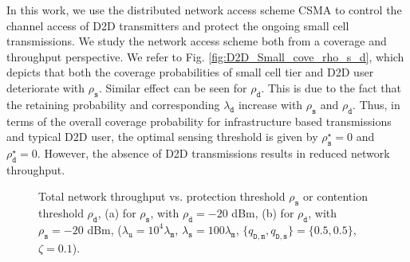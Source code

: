 \documentclass[twocolumn,english]{IEEEtran}
\theoremstyle{plain}
\theoremstyle{definition}
\begin{document}
In this work, we use the distributed network access scheme CSMA to
control the channel access of D2D transmitters and protect the ongoing
small cell transmissions. We study the network access scheme both
from a coverage and throughput perspective. We refer to Fig. \ref{fig:D2D_Small_cove_rho_s_d},
which depicts that both the coverage probabilities of small cell tier
and D2D user deteriorate with $\rho_{\mathtt{s}}$. Similar effect
can be seen for $\rho_{\mathtt{d}}$. This is due to the fact that
the retaining probability and corresponding $\lambda_{\mathtt{d}}$
increase with $\rho_{\mathtt{s}}$ and $\rho_{\mathtt{d}}$. Thus,
in terms of the overall coverage probability for infrastructure based
transmissions and typical D2D user, the optimal sensing threshold
is given by $\rho_{\mathtt{s}}^{\star}=0$ and $\rho_{\mathtt{d}}^{\star}=0$.
However, the absence of D2D transmissions results in reduced network
throughput.

\begin{figure}[t]

\protect\caption{\label{fig:Thrpt_sense}Total network throughput vs. protection threshold
$\rho_{\mathtt{s}}$ or contention threshold $\rho_{\mathtt{d}}$,
(a) for $\rho_{\mathtt{s}}$, with $\rho_{\mathtt{d}}=-20$ dBm, (b)
for $\rho_{\mathtt{d}}$, with $\rho_{\mathtt{s}}=-20$ dBm, ($\lambda_{\mathtt{u}}=10^{4}\lambda_{\mathtt{m}}$,
$\lambda_{\mathtt{s}}=100\lambda_{\mathtt{m}}$, $\{q_{\mathtt{D,m}},q_{\mathtt{D,s}}\}=\{0.5,0.5\}$,
$\zeta=0.1$). }
\end{figure}
\end{document}
